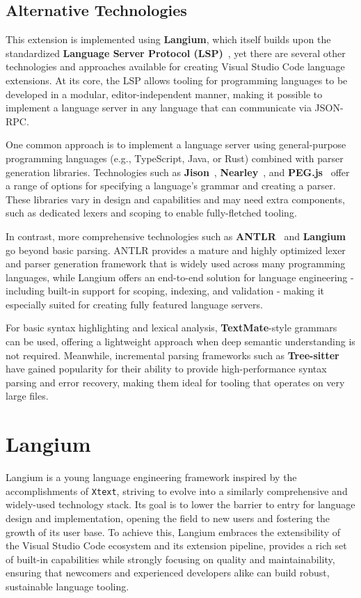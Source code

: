 \section{Alternative Technologies}

This extension is implemented using \textbf{Langium}, which itself builds upon the standardized \textbf{Language Server Protocol (LSP)}~\cite{LSP}, yet
there are several other technologies and approaches available for creating Visual Studio Code language extensions. At its core, the LSP allows tooling for programming
languages to be developed in a modular, editor-independent manner, making it possible to implement a language server in any language that can communicate via JSON-RPC.

One common approach is to implement a language server using general-purpose programming languages (e.g., TypeScript, Java, or Rust) combined with parser generation libraries.
Technologies such as \textbf{Jison}~\cite{Jison}, \textbf{Nearley}~\cite{Nearley}, and \textbf{PEG.js}~\cite{PEGjs} offer a range of options for specifying a language's grammar
and creating a parser. These libraries vary in design and capabilities and may need extra components, such as dedicated lexers and scoping to enable fully-fletched tooling.

In contrast, more comprehensive technologies such as \textbf{ANTLR}~\cite{ANTLR} and \textbf{Langium} go beyond
basic parsing. ANTLR provides a mature and highly optimized lexer and parser generation framework that is widely used across many programming languages, while Langium offers
an end-to-end solution for language engineering - including built-in support for scoping, indexing, and validation - making it especially suited for creating fully
featured language servers.

For basic syntax highlighting and lexical analysis, \textbf{TextMate}-style grammars~\cite{TextMate} can be used, offering a lightweight approach when deep semantic understanding is not required.
Meanwhile, incremental parsing frameworks such as \textbf{Tree-sitter}~\cite{Treesitter} have gained popularity for their ability to provide high-performance syntax parsing and error recovery,
making them ideal for tooling that operates on very large files.

\chapter{Langium}

Langium is a young language engineering framework inspired by the accomplishments of \verb|Xtext|, striving to evolve into a similarly comprehensive and widely-used technology stack.\cite{LangiumWeb}
Its goal is to lower the barrier to entry for language design and implementation, opening the field to new users and fostering the growth of its user base.
To achieve this, Langium embraces the extensibility of the Visual Studio Code ecosystem and its extension pipeline, provides a rich set of built-in
capabilities while strongly focusing on quality and maintainability, ensuring that newcomers and experienced developers alike can build robust, sustainable language tooling.

